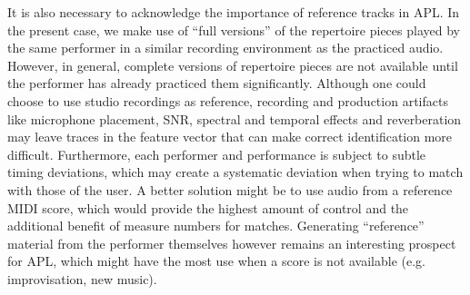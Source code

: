 \documentclass{article}
\begin{document}
It is also necessary to acknowledge the importance of reference tracks in APL. In the present case, we make use of ``full versions'' of the repertoire pieces played by the same performer in a similar recording environment as the practiced audio. However, in general, complete versions of repertoire pieces are not available until the performer has already practiced them significantly.  Although one could choose to use studio recordings as reference, recording and production artifacts like microphone placement, SNR, spectral and temporal effects and reverberation may leave traces in the feature vector that can make correct identification more difficult. Furthermore, each performer and performance is subject to subtle timing deviations, which may create a systematic deviation when trying to match with those of the user. A better solution might be to use audio from a reference MIDI score, which would provide the highest amount of control and the additional benefit of measure numbers for matches. Generating ``reference'' material from the performer themselves however remains an interesting prospect for APL, which might have the most use when a score is not available (e.g. improvisation, new music).        














\end{document}
